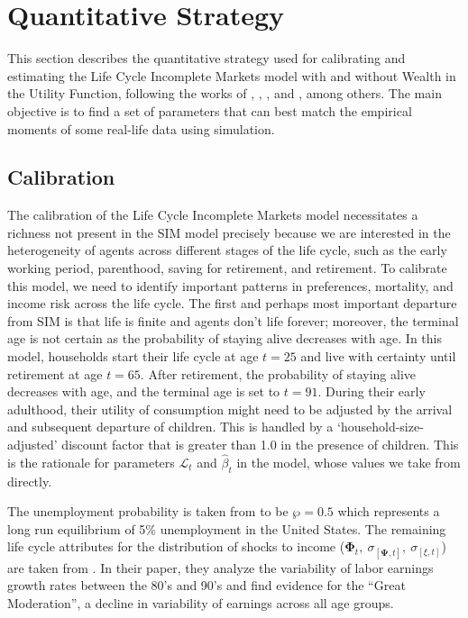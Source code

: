 \documentclass{article}
\newcommand{\DiscFac}{\beta}
\newcommand{\Alive}{\mathcal{L}}
\newcommand{\PermGroFac}{\pmb{\Phi}}
\newcommand{\PermShk}{\mathbf{\Psi}}
\newcommand{\pZero}{\wp}
\begin{document}
\section{Quantitative Strategy}\label{Quantitative Strategy}

This section describes the quantitative strategy used for calibrating and estimating the Life Cycle Incomplete Markets model with and without Wealth in the Utility Function, following the works of \cite{Cagetti_2003}, \cite{Palumbo_1999}, \cite{Gourinchas_2002}, and \cite{Sabelhaus_2010}, among others. The main objective is to find a set of parameters that can best match the empirical moments of some real-life data using simulation.

\subsection{Calibration}\label{Calibration}

The calibration of the Life Cycle Incomplete Markets model necessitates a richness not present in the SIM model precisely because we are interested in the heterogeneity of agents across different stages of the life cycle, such as the early working period, parenthood, saving for retirement, and retirement. To calibrate this model, we need to identify important patterns in preferences, mortality, and income risk across the life cycle. The first and perhaps most important departure from SIM is that life is finite and agents don't life forever; moreover, the terminal age is not certain as the probability of staying alive decreases with age. In this model, households start their life cycle at age $t = 25$ and live with certainty until retirement at age $t = 65$. After retirement, the probability of staying alive decreases with age, and the terminal age is set to $t = 91$. During their early adulthood, their utility of consumption might need to be adjusted by the arrival and subsequent departure of children. This is handled by a `household-size-adjusted' discount factor that is greater than 1.0 in the presence of children. This is the rationale for parameters $\Alive_{t}$ and $\hat{\DiscFac}_{t}$ in the model, whose values we take from \cite{Cagetti_2003} directly.

The unemployment probability is taken from \cite{Carroll_1992} to be $\pZero = 0.5$ which represents a long run equilibrium of 5\% unemployment in the United States. The remaining life cycle attributes for the distribution of shocks to income ($\PermGroFac_{t}, \ \sigma_{[\PermShk, t]}, \ \sigma_{[\xi, t]}$) are taken from \cite{Sabelhaus_2010}. In their paper, they analyze the variability of labor earnings growth rates between the 80's and 90's and find evidence for the ``Great Moderation'', a decline in variability of earnings across all age groups.
\end{document}

